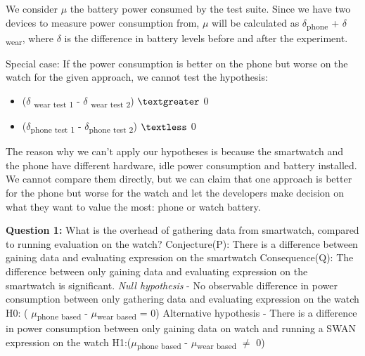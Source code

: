     We consider $\mu$ the battery power consumed by the test suite. Since we have two devices to measure power consumption from, 
    $\mu$ will be calculated as $\delta$\textsubscript{phone} +  $\delta$\textsubscript{wear}, where $\delta$ is the difference in battery levels 
    before and after the experiment.
    
    Special case:\label{special_case} If the power consumption is better on the phone but worse on the watch for the given approach, we cannot test the hypothesis:
    \begin{itemize}
      \item ($\delta$ \textsubscript{wear test 1} - $\delta$ \textsubscript{wear test 2}) $\textgreater$ 0
      \item ($\delta$\textsubscript{phone test 1} - $\delta$\textsubscript{phone test 2}) $\textless$ 0 
    \end{itemize}
    
    The reason why we can't apply our hypotheses is because the smartwatch and the phone have different hardware, idle power consumption and 
    battery installed. We cannot compare them directly, but we can claim that one approach is better for the  phone but worse for the watch and let the developers
    make decision on what they want to value the most: phone or watch battery.

    \textbf{Question 1:} What is the overhead of gathering data from smartwatch, compared to running evaluation on the watch? \newline
Conjecture(P): There is a difference between gaining data and evaluating expression on the smartwatch \newline
Consequence(Q): The difference between only gaining data and evaluating expression on the smartwatch is significant. \newline
\textit{Null hypothesis} - No observable difference in power consumption between only gathering data and evaluating expression on the watch \newline
H0: ( $\mu$\textsubscript{phone based} - $\mu$\textsubscript{wear based} = 0) \newline
  Alternative hypothesis - There is a difference in power consumption between only gaining data on watch and running a SWAN expression on the watch \newline
H1:($\mu$\textsubscript{phone based} - $\mu$\textsubscript{wear based} $\neq$ 0)  \newline


